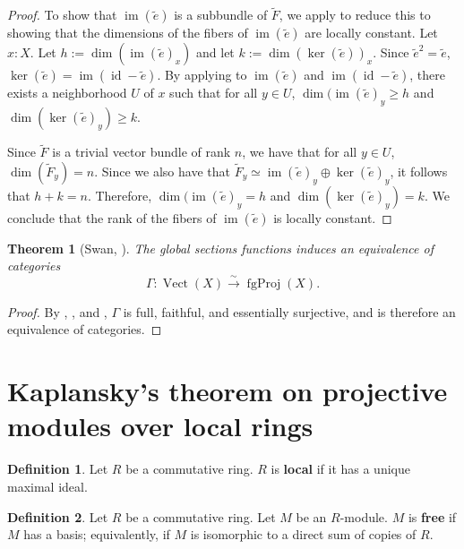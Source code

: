 \documentclass[11pt]{article}
\newcommand{\Vect}{\operatorname{Vect}}
\newcommand{\fgProj}{\operatorname{fgProj}}
\newcommand{\im}{\operatorname{im}}
\renewcommand{\ker}{\operatorname{ker}}
\newcommand{\id}{\operatorname{id}}
\theoremstyle{plain}
\newtheorem{theorem}{Theorem}[section]
\theoremstyle{definition}
\newtheorem{definition}{Definition}[section]
\begin{document}
\begin{proof}
To show that \(\im(\widetilde{e})\) is a subbundle of \(\widetilde{F}\), we apply  to reduce this to showing that the dimensions of the fibers of \(\im(\widetilde{e})\) are locally constant. Let \(x : X\). Let \(h := \dim (\im(\widetilde{e})_x)\) and let \(k := \dim(\ker(\widetilde{e}))_x\). Since \(\widetilde{e}^2 = \widetilde{e}\), \(\ker(\widetilde{e}) = \im(\id - \widetilde{e})\). By applying  to \(\im(\widetilde{e})\) and \(\im(\id - \widetilde{e})\), there exists a neighborhood \(U\) of \(x\) such that for all \(y \in U\), \(\dim(\im(\widetilde{e})_y \geq h\) and \(\dim(\ker(\widetilde{e})_y) \geq k\).

Since \(\widetilde{F}\) is a trivial vector bundle of rank \(n\), we have that for all \(y \in U\), \(\dim(\widetilde{F}_y) = n\). Since we also have that \(\widetilde{F}_y \simeq \im(\widetilde{e})_y \oplus \ker(\widetilde{e})_y\), it follows that \(h + k = n\). Therefore, \(\dim(\im(\widetilde{e})_y = h\) and \(\dim(\ker(\widetilde{e})_y) = k\). We conclude that the rank of the fibers of \(\im(\widetilde{e})\) is locally constant.
\end{proof}

\begin{theorem}[Swan, \cite{swan1962vector}] \label{thm:swan}
  The global sections functions induces an equivalence of categories
  \[\Gamma : \Vect(X) \overset{\sim}{\longrightarrow} \fgProj(X).\]
\end{theorem}

\begin{proof}
  By , , and , \(\Gamma\) is full, faithful, and essentially surjective, and is therefore an equivalence of categories.
\end{proof}

\section{Kaplansky's theorem on projective modules over local rings}

\begin{definition}\label{def:local-ring}
  Let \(R\) be a commutative ring. \(R\) is \textbf{local} if it has a unique maximal ideal.
\end{definition}

\begin{definition}\label{def:free-module}
  Let \(R\) be a commutative ring. Let \(M\) be an \(R\)-module. \(M\) is \textbf{free} if \(M\) has a basis; equivalently, if \(M\) is isomorphic to a direct sum of copies of \(R\).
\end{definition}
\end{document}
